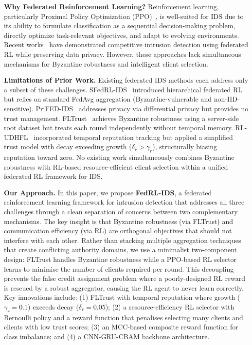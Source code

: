 \documentclass[conference]{IEEEtran}
\begin{document}
\textbf{Why Federated Reinforcement Learning?}
Reinforcement learning, particularly Proximal Policy Optimization (PPO)~\cite{rlintro}, is well-suited for IDS due to its ability to formulate classification as a sequential decision-making problem, directly optimize task-relevant objectives, and adapt to evolving environments. Recent works~\cite{sfedrl, fedrl_attention} have demonstrated competitive intrusion detection using federated RL while preserving data privacy. However, these approaches lack simultaneous mechanisms for Byzantine robustness and intelligent client selection.

\textbf{Limitations of Prior Work.}
Existing federated IDS methods each address only a subset of these challenges. SFedRL-IDS~\cite{sfedrl} introduced hierarchical federated RL but relies on standard FedAvg aggregation (Byzantine-vulnerable and non-IID-sensitive). PriFED-IDS~\cite{prifeds} addresses privacy via differential privacy but provides no trust management. FLTrust~\cite{fltrust} achieves Byzantine robustness using a server-side root dataset but treats each round independently without temporal memory. RL-UDHFL~\cite{rludhfl} incorporated temporal reputation tracking but applied a simplified trust model with decay exceeding growth ($\delta_r > \gamma_r$), structurally biasing reputation toward zero. No existing work simultaneously combines Byzantine robustness with RL-based resource-efficient client selection within a unified federated RL framework for IDS.

\textbf{Our Approach.}
In this paper, we propose \textbf{FedRL-IDS}, a federated reinforcement learning framework for intrusion detection that addresses all three challenges through a clean separation of concerns between two complementary mechanisms. The key insight is that Byzantine robustness (via FLTrust) and communication efficiency (via RL) are orthogonal objectives that should not interfere with each other. Rather than stacking multiple aggregation techniques that create conflicting authority domains, we use a minimalist two-component design: FLTrust handles Byzantine robustness while a PPO-based RL selector learns to minimise the number of clients required per round. This decoupling prevents the false credit assignment problem where a poorly-designed RL reward is rescued by a robust aggregator, causing the RL agent to never learn correctly. Key innovations include: (1) FLTrust with temporal reputation where growth ($\gamma_r=0.1$) exceeds decay ($\delta_r=0.05$); (2) a resource-efficiency RL selector with Bernoulli policy and a reward function that penalises selecting many clients and clients with low trust scores; (3) an MCC-based composite reward function for class imbalance; and (4) a CNN-GRU-CBAM backbone architecture.
\end{document}
